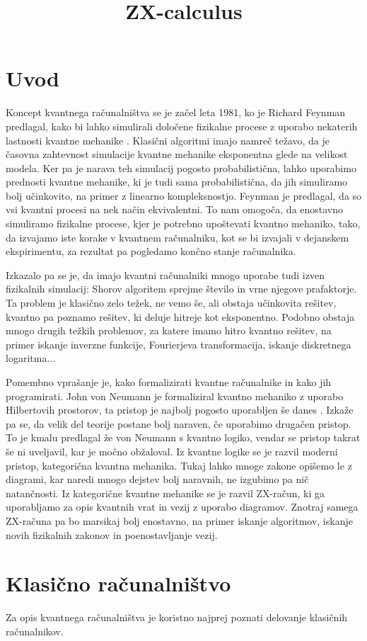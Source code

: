 \documentclass[mat1]{fmfdelo}
\title{ZX-calculus}
\begin{document}
\section{Uvod}
Koncept kvantnega računalništva se je začel leta 1981, ko je Richard Feynman predlagal, kako bi lahko simulirali določene fizikalne procese z uporabo nekaterih lastnosti kvantne mehanike \cite{feynmann}. Klasični algoritmi imajo namreč težavo, da je časovna zahtevnost simulacije kvantne mehanike eksponentna glede na velikost modela. Ker pa je narava teh simulacij pogosto probabilistična, lahko uporabimo prednosti kvantne mehanike, ki je tudi sama probabilistična, da jih simuliramo bolj učinkovito, na primer z linearno kompleksnostjo. Feynman je predlagal, da so vsi kvantni procesi na nek način ekvivalentni. To nam omogoča, da enostavno simuliramo fizikalne procese, kjer je potrebno upoštevati kvantno mehaniko, tako, da izvajamo iste korake v kvantnem računalniku, kot se bi izvajali v dejanskem ekspirimentu, za rezultat pa pogledamo končno stanje računalnika.

Izkazalo pa se je, da imajo kvantni računalniki mnogo uporabe tudi izven fizikalnih simulacij: Shorov algoritem sprejme število in vrne njegove prafaktorje. Ta problem je klasično zelo težek, ne vemo še, ali obstaja učinkovita rešitev, kvantno pa poznamo rešitev, ki deluje hitreje kot eksponentno. Podobno obstaja mnogo drugih težkih problemov, za katere imamo hitro kvantno rešitev, na primer iskanje inverzne funkcije, Fourierjeva transformacija, iskanje diskretnega logaritma...

Pomembno vprašanje je, kako formalizirati kvantne računalnike in kako jih programirati. John von Neumann je formaliziral kvantno mehaniko z uporabo Hilbertovih prostorov, ta pristop je najbolj pogosto uporabljen še danes \cite{neumann}. Izkaže pa se, da velik del teorije postane bolj naraven, če uporabimo drugačen pristop. To je kmalu predlagal že von Neumann s kvantno logiko, vendar se pristop takrat še ni uveljavil, kar je močno obžaloval. Iz kvantne logike se je razvil moderni pristop, kategorična kvantna mehanika. Tukaj lahko mnoge zakone opišemo le z diagrami, kar naredi mnogo dejstev bolj naravnih, ne izgubimo pa nič natančnosti. Iz kategorične kvantne mehanike se je razvil ZX-račun, ki ga uporabljamo za opis kvantnih vrat in vezij z uporabo diagramov. Znotraj samega ZX-računa pa bo marsikaj bolj enostavno, na primer iskanje algoritmov, iskanje novih fizikalnih zakonov in poenostavljanje vezij.

\section{Klasično računalništvo}
Za opis kvantnega računalništva je koristno najprej poznati delovanje klasičnih računalnikov. 
\end{document}

